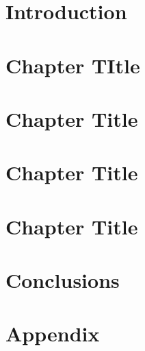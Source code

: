 \documentclass[12pt,letterpaper,twoside,openright]{report}
\begin{document}
\cleardoublepage{}

\pagestyle{fancy} 

\chapter{Introduction}


\chapter{Chapter TItle}


\chapter{Chapter Title}


\chapter{Chapter Title}


\chapter{Chapter Title} 


\chapter{Conclusions}


\printbibliography[title={References}, heading=bibintoc]

\appendix
\chapter{Appendix}

\end{document}
